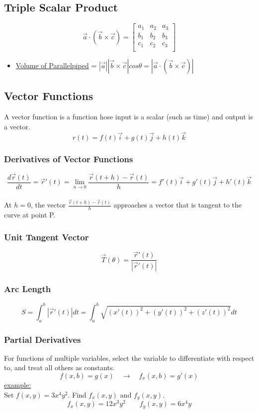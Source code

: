\documentclass[11pt]{article}
\begin{document}
\subsection{Triple Scalar Product}
$$
\vec{a} \cdot (\vec{b} \times \vec{c}) = 
\begin{bmatrix}
a_1&a_2&a_3 \\
b_1&b_2&b_3 \\
c_1&c_2&c_3 \\
\end{bmatrix}
$$
\begin{itemize}
\item \underline{Volume of Parallelpiped} = $ |\vec{a}||\vec{b} \times \vec{c}|cos\theta = |\vec{a} \cdot (\vec{b} \times \vec{c})|$
\end{itemize}
\subsection{Vector Functions}
A vector function is a function hose input is a scalar (such as time) and output is a vector.
$$
r(t) = f(t)\vec{i} + g(t)\vec{j} + h(t)\vec{k}
$$
\subsubsection{Derivatives of Vector Functions}
\smallskip
$$
\frac{d\vec{r}(t)}{dt} = \vec{r}'(t) = \lim_{n\to0} \frac{\vec{r}(t+h)-\vec{r}(t)}{h} = f'(t)\vec{i} + g'(t)\vec{j} + h'(t)\vec{k}
$$
\\
At $h=0$, the vector $\frac{\vec{r}(t+h)-\vec{r}(t)}{h}$ approaches a vector that is tangent to the curve at point P.
\subsubsection{Unit Tangent Vector}
$$\vec{T}(\theta) = \frac{\vec{r}'(t)}{|\vec{r}'(t)|}$$
\subsubsection{Arc Length}
$$ S = \int_{a}^{b} |\vec{r}'(t)|dt = \int_{a}^{b} \sqrt{(x'(t))^2 + (y'(t))^2 + (z'(t))^2} dt
$$
\subsubsection{Partial Derivatives}
For functions of multiple variables, select the variable to differentiate with respect to, and treat all others as constants.
$$
f(x, b) = g(x) \quad \rightarrow \quad f_x(x, b) = g'(x)
$$
\medskip
\underline{example:} \\
Set $ f(x, y) = 3x^4y^2$. Find $f_x(x, y)$ and $f_y(x, y)$.
$$ f_x(x, y) = 12x^3y^2 \quad \quad f_y(x, y) = 6x^4y$$
\end{document}
